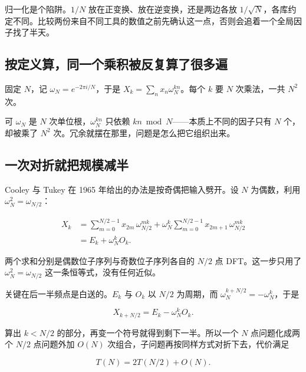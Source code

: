 归一化是个陷阱。\(1/N\) 放在正变换、放在逆变换，还是两边各放 \(1/\sqrt N\)，各库约定不同。比较两份来自不同工具的数值之前先确认这一点，否则会追着一个全局因子找了半天。

\subsection{按定义算，同一个乘积被反复算了很多遍}

固定 \(N\)，记 \(\omega_N=e^{-2\pi i/N}\)，于是 \(X_k=\sum_n x_n\omega_N^{kn}\)。每个 \(k\) 要 \(N\) 次乘法，一共 \(N^2\) 次。

可 \(\omega_N\) 是 \(N\) 次单位根，\(\omega_N^{kn}\) 只依赖 \(kn\bmod N\)——本质上不同的因子只有 \(N\) 个，却被乘了 \(N^2\) 次。冗余就摆在那里，问题是怎么把它组织出来。

\subsection{一次对折就把规模减半}

Cooley 与 Tukey 在 1965 年给出的办法是按奇偶把输入劈开。设 \(N\) 为偶数，利用 \(\omega_N^2=\omega_{N/2}\)：

\[
\begin{aligned}
X_k&=\sum_{m=0}^{N/2-1}x_{2m}\,\omega_{N/2}^{mk}
+\omega_N^{k}\sum_{m=0}^{N/2-1}x_{2m+1}\,\omega_{N/2}^{mk}\\
&=E_k+\omega_N^{k}O_k .
\end{aligned}
\]

两个求和分别是偶数位子序列与奇数位子序列各自的 \(N/2\) 点 DFT。这一步只用了 \(\omega_N^2=\omega_{N/2}\) 这一条恒等式，没有任何近似。

关键在后一半频点是白送的。\(E_k\) 与 \(O_k\) 以 \(N/2\) 为周期，而 \(\omega_N^{k+N/2}=-\omega_N^{k}\)，于是

\[
X_{k+N/2}=E_k-\omega_N^{k}O_k .
\]

算出 \(k<N/2\) 的部分，再变一个符号就得到剩下一半。所以一个 \(N\) 点问题化成两个 \(N/2\) 点问题外加 \(O(N)\) 次组合，子问题再按同样方式对折下去，代价满足

\[
T(N)=2T(N/2)+O(N).
\]

